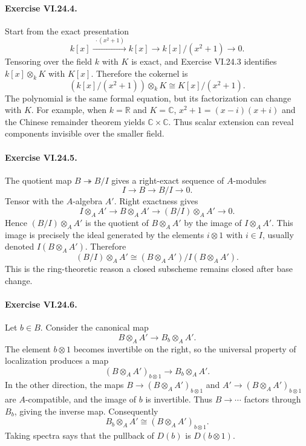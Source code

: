 \paragraph{Exercise VI.24.4.}
\begin{solution}
Start from the exact presentation
\[
k[x]\xrightarrow{\;\cdot(x^2+1)\;}k[x]\longrightarrow k[x]/(x^2+1)\longrightarrow0.
\]
Tensoring over the field $k$ with $K$ is exact, and Exercise VI.24.3 identifies
$k[x]\otimes_kK$ with $K[x]$.  Therefore the cokernel is
\[
(k[x]/(x^2+1))\otimes_kK\cong K[x]/(x^2+1).
\]
The polynomial is the same formal equation, but its factorization can change with $K$.  For
example, when $k=\mathbb R$ and $K=\mathbb C$,
$x^2+1=(x-i)(x+i)$ and the Chinese remainder theorem yields $\mathbb C\times\mathbb C$.
Thus scalar extension can reveal components invisible over the smaller field.
\end{solution}

\paragraph{Exercise VI.24.5.}
\begin{solution}
The quotient map $B\twoheadrightarrow B/I$ gives a right-exact sequence of $A$-modules
\[
I\longrightarrow B\longrightarrow B/I\longrightarrow0.
\]
Tensor with the $A$-algebra $A'$.  Right exactness gives
\[
I\otimes_AA'\longrightarrow B\otimes_AA'\longrightarrow(B/I)\otimes_AA'\longrightarrow0.
\]
Hence $(B/I)\otimes_AA'$ is the quotient of $B\otimes_AA'$ by the image of
$I\otimes_AA'$.  This image is precisely the ideal generated by the elements $i\otimes1$ with
$i\in I$, usually denoted $I(B\otimes_AA')$.  Therefore
\[
(B/I)\otimes_AA'\cong(B\otimes_AA')/I(B\otimes_AA').
\]
This is the ring-theoretic reason a closed subscheme remains closed after base change.
\end{solution}

\paragraph{Exercise VI.24.6.}
\begin{solution}
Let $b\in B$.  Consider the canonical map
\[
B\otimes_AA'\longrightarrow B_b\otimes_AA'.
\]
The element $b\otimes1$ becomes invertible on the right, so the universal property of localization
produces a map
\[
(B\otimes_AA')_{b\otimes1}\longrightarrow B_b\otimes_AA'.
\]
In the other direction, the maps $B\to(B\otimes_AA')_{b\otimes1}$ and
$A'\to(B\otimes_AA')_{b\otimes1}$ are $A$-compatible, and the image of $b$ is invertible.  Thus
$B\to\cdots$ factors through $B_b$, giving the inverse map.  Consequently
\[
B_b\otimes_AA'\cong(B\otimes_AA')_{b\otimes1}.
\]
Taking spectra says that the pullback of $D(b)$ is $D(b\otimes1)$.
\end{solution}

